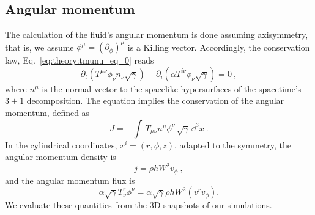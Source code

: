 




\subsection{Angular momentum} \label{sec:bns_sims:method:ang_mom}



%

The calculation of the fluid's angular momentum is done assuming axisymmetry,
that is, we assume $\phi^{\mu} = (\partial_{\phi})^{\mu}$ is a Killing
vector. 
Accordingly, the conservation law, Eq.~\eqref{eq:theory:tmunu_eq_0} reads
%
\begin{equation}
\partial_t(T^{\mu\nu}\phi_{\nu}n_{\nu}\sqrt{\gamma}) -
\partial_i(\alpha T^{i \nu}\phi_{\nu}\sqrt{\gamma}) = 0 \ ,
\end{equation}
%
where $n^\mu$ is the normal vector to the spacelike hypersurfaces of
the spacetime's $3+1$ decomposition.
%
The equation implies the conservation of the angular momentum, 
defined as 
\begin{equation}
J = %
-\int \,
T_{\mu\nu}n^{\mu}\phi^{\nu}\,\sqrt{\gamma}\, \dd^3 x\ .
\end{equation}
%
In the cylindrical coordinates, $x^i=(r,\phi,z)$, adapted to the symmetry, 
the angular momentum density is  
%
\begin{equation}
j = %
\rho h W^2 v_{\phi} \ ,
\label{eq:method:ang_mom}
\end{equation}
%
and the angular momentum flux is 
%
\begin{equation}
\alpha\sqrt{\gamma}T^r _{\nu}\phi^{\nu} =
\alpha\sqrt{\gamma}\rho h W^2 (v^{r}v_{\phi}) .
\end{equation}
%
We evaluate these quantities from the $3$D snapshots of our simulations.




